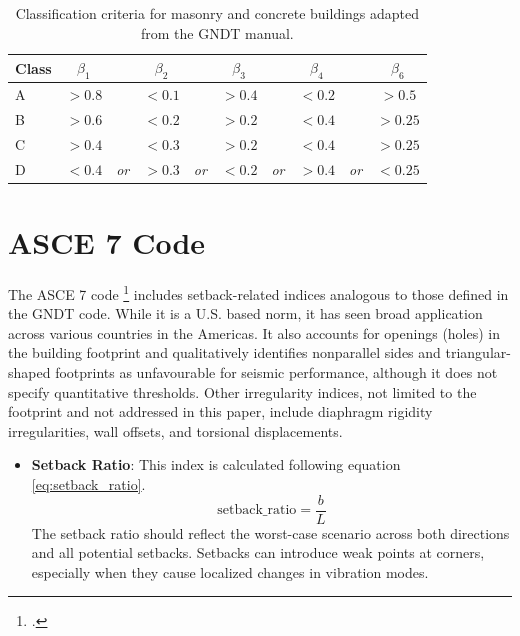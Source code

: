 \begin{refsection}
\begin{table}[htbp]
\centering
\caption{Classification criteria for masonry and concrete buildings adapted from the GNDT manual.}
\label{tab:GNDT_limits}
\begin{tabular}{|l|ccccccccc|}
\hline
\textbf{Class} & $\beta_1$ & & $\beta_2$ & & $\beta_3$ & & $\beta_4$ & & $\beta_6$ \\
\hline
A & $> 0.8$ & & $< 0.1$ & & $> 0.4$ & & $< 0.2$ & & $> 0.5$ \\
\hline
B & $> 0.6$ & & $< 0.2$ & & $> 0.2$ & & $< 0.4$ & & $> 0.25$ \\
\hline
C & $> 0.4$ & & $< 0.3$ & & $> 0.2$ & & $< 0.4$ & & $> 0.25$ \\
\hline
D & $< 0.4$ & \textit{or} & $> 0.3$ & \textit{or} & $< 0.2$ &  \textit{or} & $> 0.4$ & \textit{or} & $< 0.25$\\
\hline
\end{tabular}
\end{table}

\FloatBarrier

\renewcommand{\sectionnametext}{ASCE 7 Code}
\renewcommand{\headingtextR}{\thesection. \sectionnametext}
\section{\sectionnametext}

The ASCE 7 code \footcite{asce_american_society_of_civil_engineers_minimum_2021} includes setback-related indices analogous to those defined in the GNDT code. While it is a U.S. based norm, it has seen broad application across various countries in the Americas. It also accounts for openings (holes) in the building footprint and qualitatively identifies nonparallel sides and triangular-shaped footprints as unfavourable for seismic performance, although it does not specify quantitative thresholds. Other irregularity indices, not limited to the footprint and not addressed in this paper, include diaphragm rigidity irregularities, wall offsets, and torsional displacements.

\begin{itemize}
    \item \textbf{Setback Ratio}: This index is calculated following equation \ref{eq:setback_ratio}.
    \begin{equation} 
        \label{eq:setback_ratio}
        \text{setback\_ratio} = \frac{b}{L}
    \end{equation}
    The setback ratio should reflect the worst-case scenario across both directions and all potential setbacks. Setbacks can introduce weak points at corners, especially when they cause localized changes in vibration modes.


\end{itemize}
\end{refsection}
